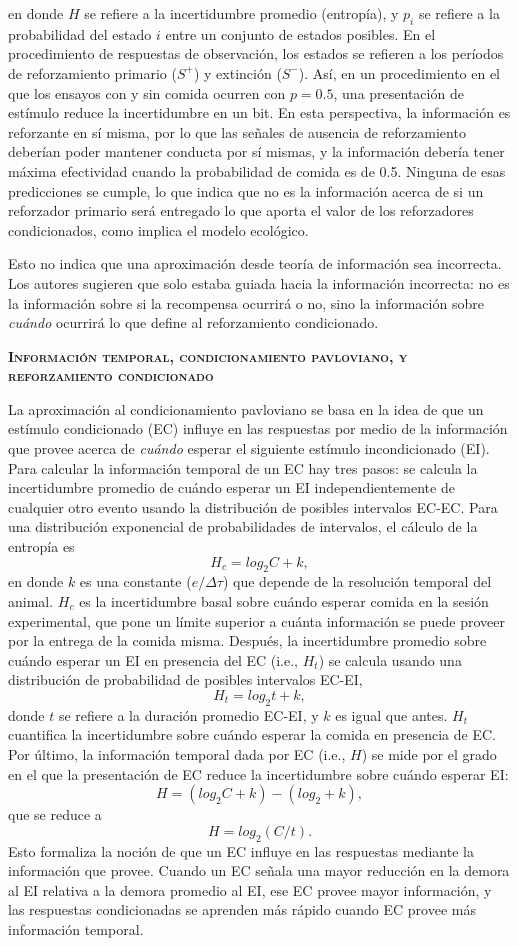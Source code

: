 \documentclass[a4paper,12pt]{article}
\begin{document}
en donde $H$ se refiere a la incertidumbre promedio (entropía), y $p_i$ se refiere a la probabilidad del estado $i$ entre un conjunto de estados posibles. En el procedimiento de respuestas de observación, los estados se refieren a los períodos de reforzamiento primario ($S^+$) y extinción ($S^-$). Así, en un procedimiento en el que los ensayos con y sin comida ocurren con $p=0{.}5$, una presentación de estímulo reduce la incertidumbre en un bit. En esta perspectiva, la información es reforzante en sí misma, por lo que las señales de ausencia de reforzamiento deberían poder mantener conducta por sí mismas, y la información debería tener máxima efectividad cuando la probabilidad de comida es de 0.5. Ninguna de esas predicciones se cumple, lo que indica que no es la información acerca de si un reforzador primario será entregado lo que aporta el valor de los reforzadores condicionados, como implica el modelo ecológico.

Esto no indica que una aproximación desde teoría de información sea incorrecta. Los autores sugieren que solo estaba guiada hacia la información incorrecta: no es la información sobre si la recompensa ocurrirá o no, sino la información sobre {\itshape cuándo} ocurrirá lo que define al reforzamiento condicionado.

{\scshape\bfseries Información temporal, condicionamiento pavloviano, y reforzamiento condicionado}

La aproximación al condicionamiento pavloviano se basa en la idea de que un estímulo condicionado (EC) influye en las respuestas por medio de la información que provee acerca de {\itshape cuándo} esperar el siguiente estímulo incondicionado (EI). Para calcular la información temporal de un EC hay tres pasos: se calcula la incertidumbre promedio de cuándo esperar un EI independientemente de cualquier otro evento usando la distribución de posibles intervalos EC-EC. Para una distribución exponencial de probabilidades de intervalos, el cálculo de la entropía es
$$
H_c=log_2C+k,
$$
en donde $k$ es una constante ($e/\Delta\tau$) que depende de la resolución temporal del animal. $H_c$ es la incertidumbre basal sobre cuándo esperar comida en la sesión experimental, que pone un límite superior a cuánta información se puede proveer por la entrega de la comida misma. Después, la incertidumbre promedio sobre cuándo esperar un EI en presencia del EC (i.e., $H_t$) se calcula usando una distribución de probabilidad de posibles intervalos EC-EI,
$$
H_t=log_2t+k,
$$
donde $t$ se refiere a la duración promedio EC-EI, y $k$ es igual que antes. $H_t$ cuantifica la incertidumbre sobre cuándo esperar la comida en presencia de EC. Por último, la información temporal dada por EC (i.e., $H$) se mide por el grado en el que la presentación de EC reduce la incertidumbre sobre cuándo esperar EI:
$$
H=(log_2C+k)-(log_2+k),
$$
que se reduce a 
$$
H=log_2(C/t).
$$
Esto formaliza la noción de que un EC influye en las respuestas mediante la información que provee. Cuando un EC señala una mayor reducción en la demora al EI relativa a la demora promedio al EI, ese EC provee mayor información, y las respuestas condicionadas se aprenden más rápido cuando EC provee más información temporal.
\end{document}
